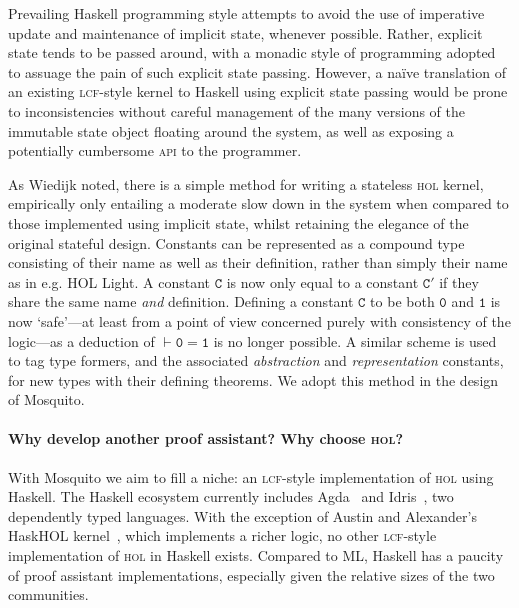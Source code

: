 \documentclass{llncs}
\newcommand{\mosquito}{Mosquito\xspace}
\begin{document}
Prevailing Haskell programming style attempts to avoid the use of imperative update and maintenance of implicit state, whenever possible.
Rather, explicit state tends to be passed around, with a monadic style of programming adopted to assuage the pain of such explicit state passing.
However, a na\"ive translation of an existing \textsc{lcf}-style kernel to Haskell using explicit state passing would be prone to inconsistencies without careful management of the many versions of the immutable state object floating around the system, as well as exposing a potentially cumbersome \textsc{api} to the programmer.

As Wiedijk noted, there is a simple method for writing a stateless \textsc{hol} kernel, empirically only entailing a moderate slow down in the system when compared to those implemented using implicit state, whilst retaining the elegance of the original stateful design.
Constants can be represented as a compound type consisting of their name as well as their definition, rather than simply their name as in e.g. HOL Light.
A constant $\mathtt{C}$ is now only equal to a constant $\mathtt{C'}$ if they share the same name \emph{and} definition.
Defining a constant $\mathtt{C}$ to be both $\mathtt{0}$ and $\mathtt{1}$ is now `safe'---at least from a point of view concerned purely with consistency of the logic---as a deduction of $\vdash \mathtt{0 = 1}$ is no longer possible.
A similar scheme is used to tag type formers, and the associated \emph{abstraction} and \emph{representation} constants, for new types with their defining theorems.
We adopt this method in the design of \mosquito.

\paragraph{Why develop another proof assistant?  Why choose \textsc{hol}?}
With \mosquito we aim to fill a niche: an \textsc{lcf}-style implementation of \textsc{hol} using Haskell.
The Haskell ecosystem currently includes Agda~\cite{bove:brief:2009} and Idris~\cite{brady:idris:2013}, two dependently typed languages.
With the exception of Austin and Alexander's HaskHOL kernel~\cite{austin:stateless:2013}, which implements a richer logic, no other \textsc{lcf}-style implementation of \textsc{hol} in Haskell exists.
Compared to ML, Haskell has a paucity of proof assistant implementations, especially given the relative sizes of the two communities.
\end{document}
